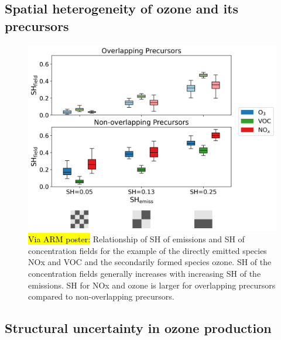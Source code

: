 
\subsection{Spatial heterogeneity of ozone and its precursors}

\begin{figure}[h]
    \centering
    \includegraphics[width=\textwidth]{figures/field-SH-vs-emiss-SH-two-rows.png}
    \caption{\hl{Via ARM poster:} Relationship of SH of emissions and SH of concentration fields for the example of the directly emitted species NOx and VOC and the secondarily formed species ozone. SH of the concentration fields generally increases with increasing SH of the emissions. SH for NOx and ozone is larger for overlapping precursors compared to non-overlapping precursors.}
  \end{figure}

\subsection{Structural uncertainty in ozone production}

